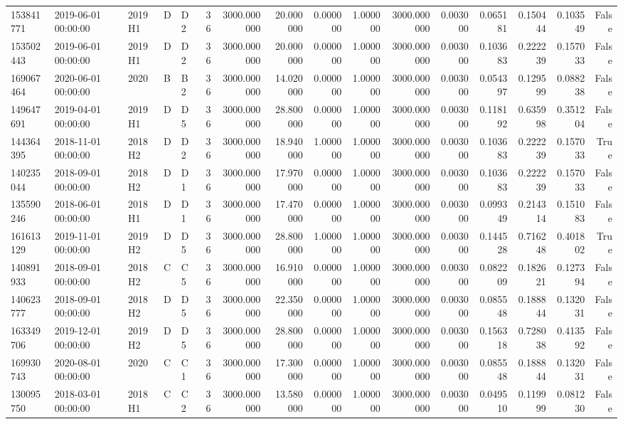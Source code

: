 \begin{tabular}{lllllrrrrrrrrrrr}
153841771 & 2019-06-01 00:00:00 & 2019H1 & D & D2 & 36 & 3000.000000 & 20.000000 & 0.000000 & 1.000000 & 3000.000000 & 0.003000 & 0.065181 & 0.150444 & 0.103549 & False \\
153502443 & 2019-06-01 00:00:00 & 2019H1 & D & D2 & 36 & 3000.000000 & 20.000000 & 0.000000 & 1.000000 & 3000.000000 & 0.003000 & 0.103683 & 0.222239 & 0.157033 & False \\
169067464 & 2020-06-01 00:00:00 & 2020 & B & B2 & 36 & 3000.000000 & 14.020000 & 0.000000 & 1.000000 & 3000.000000 & 0.003000 & 0.054397 & 0.129599 & 0.088238 & False \\
149647691 & 2019-04-01 00:00:00 & 2019H1 & D & D5 & 36 & 3000.000000 & 28.800000 & 0.000000 & 1.000000 & 3000.000000 & 0.003000 & 0.118192 & 0.635998 & 0.351204 & False \\
144364395 & 2018-11-01 00:00:00 & 2018H2 & D & D2 & 36 & 3000.000000 & 18.940000 & 1.000000 & 1.000000 & 3000.000000 & 0.003000 & 0.103683 & 0.222239 & 0.157033 & True \\
140235044 & 2018-09-01 00:00:00 & 2018H2 & D & D1 & 36 & 3000.000000 & 17.970000 & 0.000000 & 1.000000 & 3000.000000 & 0.003000 & 0.103683 & 0.222239 & 0.157033 & False \\
135590246 & 2018-06-01 00:00:00 & 2018H1 & D & D1 & 36 & 3000.000000 & 17.470000 & 0.000000 & 1.000000 & 3000.000000 & 0.003000 & 0.099349 & 0.214314 & 0.151083 & False \\
161613129 & 2019-11-01 00:00:00 & 2019H2 & D & D5 & 36 & 3000.000000 & 28.800000 & 1.000000 & 1.000000 & 3000.000000 & 0.003000 & 0.144528 & 0.716248 & 0.401802 & True \\
140891933 & 2018-09-01 00:00:00 & 2018H2 & C & C5 & 36 & 3000.000000 & 16.910000 & 0.000000 & 1.000000 & 3000.000000 & 0.003000 & 0.082209 & 0.182621 & 0.127394 & False \\
140623777 & 2018-09-01 00:00:00 & 2018H2 & D & D5 & 36 & 3000.000000 & 22.350000 & 0.000000 & 1.000000 & 3000.000000 & 0.003000 & 0.085548 & 0.188844 & 0.132031 & False \\
163349706 & 2019-12-01 00:00:00 & 2019H2 & D & D5 & 36 & 3000.000000 & 28.800000 & 0.000000 & 1.000000 & 3000.000000 & 0.003000 & 0.156318 & 0.728038 & 0.413592 & False \\
169930743 & 2020-08-01 00:00:00 & 2020 & C & C1 & 36 & 3000.000000 & 17.300000 & 0.000000 & 1.000000 & 3000.000000 & 0.003000 & 0.085548 & 0.188844 & 0.132031 & False \\
130095750 & 2018-03-01 00:00:00 & 2018H1 & C & C2 & 36 & 3000.000000 & 13.580000 & 0.000000 & 1.000000 & 3000.000000 & 0.003000 & 0.049510 & 0.119999 & 0.081230 & False \\

\end{tabular}
